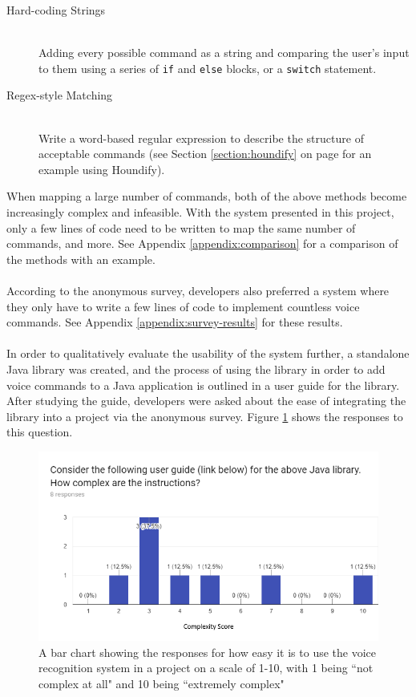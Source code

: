 \documentclass[11pt]{article}
\begin{document}
\begin{description}
\item[Hard-coding Strings] \hfill \\ Adding every possible command as a string and comparing the user's input to them using a series of \texttt{if} and \texttt{else} blocks, or a \texttt{switch} statement.
\item[Regex-style Matching] \hfill \\ Write a word-based regular expression to describe the structure of acceptable commands (see Section \ref{section:houndify} on page \pageref{section:houndify} for an example using Houndify).
\end{description}

When mapping a large number of commands, both of the above methods become increasingly complex and infeasible. With the system presented in this project, only a few lines of code need to be written to map the same number of commands, and more. See Appendix \ref{appendix:comparison} for a comparison of the methods with an example.
\\
\\
According to the anonymous survey, developers also preferred a system where they only have to write a few lines of code to implement countless voice commands. See Appendix \ref{appendix:survey-results} for these results.
\\
\\
In order to qualitatively evaluate the usability of the system further, a standalone Java library was created, and the process of using the library in order to add voice commands to a Java application is outlined in a user guide for the library. After studying the guide, developers were asked about the ease of integrating the library into a project via the anonymous survey. Figure \ref{fig:survey-ease} shows the responses to this question.

\begin{figure}[H]
\begin{center}
  \includegraphics[width=\linewidth]{survey-ease}
  \caption{A bar chart showing the responses for how easy it is to use the voice recognition system in a project on a scale of 1-10, with 1 being ``not complex at all" and 10 being ``extremely complex"}
  \label{fig:survey-ease}
  \end{center}
\end{figure}
\end{document}
